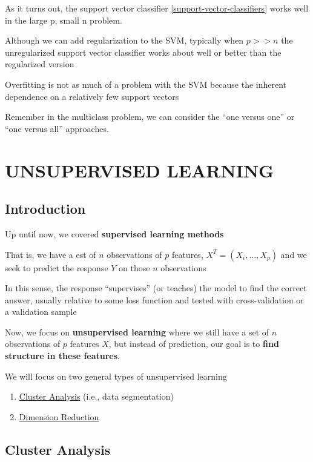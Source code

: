 \documentclass[
]{book}
\providecommand{\tightlist}{%
  \setlength{\itemsep}{0pt}\setlength{\parskip}{0pt}}
\begin{document}
As it turns out, the support vector classifier \ref{support-vector-classifiers} works well in the large p, small n problem.

Although we can add regularization to the SVM, typically when \(p >> n\) the unregularized support vector classifier works about well or better than the regularized version

Overfitting is not as much of a problem with the SVM because the inherent dependence on a relatively few support vectors

Remember in the multiclass problem, we can consider the ``one versus one'' or ``one versus all'' approaches.

\hypertarget{part-unsupervised-learning}{%
\part{UNSUPERVISED LEARNING}\label{part-unsupervised-learning}}

\hypertarget{introduction}{%
\chapter{Introduction}\label{introduction}}

Up until now, we covered \textbf{supervised learning methods}

That is, we have a est of \(n\) observations of \(p\) features, \(X^T= (X_i, \dots, X_p)\) and we seek to predict the response \(Y\) on those \(n\) observations

In this sense, the response ``supervises'' (or teaches) the model to find the correct answer, usually relative to some loss function and tested with cross-validation or a validation sample

Now, we focus on \textbf{unsupervised learning} where we still have a set of \(n\) observations of \(p\) features \(X\), but instead of prediction, our goal is to \textbf{find structure in these features}.

We will focus on two general types of unsupervised learning

\begin{enumerate}
\def\labelenumi{\arabic{enumi}.}
\tightlist
\item
  \protect\hyperlink{cluster-analysis}{Cluster Analysis} (i.e., data segmentation)
\item
  \protect\hyperlink{dimension-reduction-1}{Dimension Reduction}
\end{enumerate}

\hypertarget{cluster-analysis}{%
\chapter{Cluster Analysis}\label{cluster-analysis}}
\end{document}
